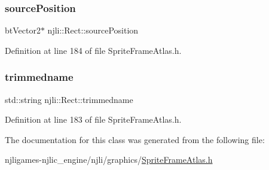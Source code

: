 \mbox{\label{classnjli_1_1_rect_a4ea7c70282ea45aeb109a7efaaf8c979}} 
\subsubsection{\texorpdfstring{source\+Position}{sourcePosition}}
{\footnotesize\ttfamily bt\+Vector2$\ast$ njli\+::\+Rect\+::source\+Position\hspace{0.3cm}{\ttfamily [private]}}



Definition at line 184 of file Sprite\+Frame\+Atlas.\+h.

\mbox{\label{classnjli_1_1_rect_a2caf9b5b79ddae7f604841cfdbbbb93f}} 
\subsubsection{\texorpdfstring{trimmedname}{trimmedname}}
{\footnotesize\ttfamily std\+::string njli\+::\+Rect\+::trimmedname\hspace{0.3cm}{\ttfamily [private]}}



Definition at line 183 of file Sprite\+Frame\+Atlas.\+h.



The documentation for this class was generated from the following file\+:\begin{DoxyCompactItemize}
\item 
njligames-\/njlic\+\_\+engine/njli/graphics/\mbox{\hyperlink{_sprite_frame_atlas_8h}{Sprite\+Frame\+Atlas.\+h}}\end{DoxyCompactItemize}
